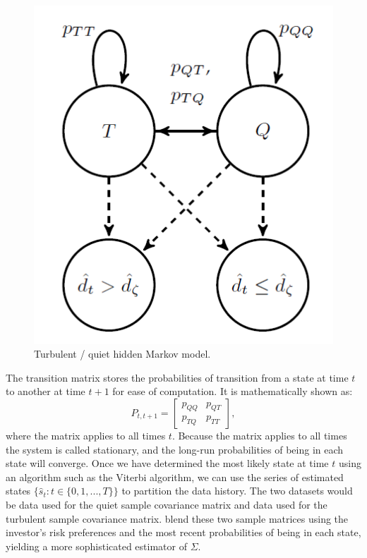 \documentclass[
]{article}
\begin{document}
\begin{figure}

{\centering \includegraphics{quiet_turb_hmm} 

}

\caption{Turbulent / quiet hidden Markov model.}\label{fig:hmm}
\end{figure}

The transition matrix stores the probabilities of transition from a state at time \(t\) to another at
time \(t + 1\) for ease of computation. It is mathematically shown as:
\[P_{t, t + 1} = \begin{bmatrix} 
p_{QQ} & p_{QT} \\
p_{TQ} & p_{TT}  
\end{bmatrix},\]
where the matrix applies to all times \(t\). Because the matrix applies to all times the system is called
stationary, and the long-run probabilities of being in each state will converge. Once we have
determined the most likely state at time \(t\) using an algorithm such as the Viterbi algorithm, we can
use the series of estimated states \(\{\hat{s}_t: t \in \{0, 1, ..., T\}\}\) to partition the
data history. The two datasets would be data used for the quiet sample covariance matrix and data used
for the turbulent sample covariance matrix. \citet{FD18} blend these two sample matrices using the investor's
risk preferences and the most recent probabilities of being in each state, yielding a more
sophisticated estimator of \(\Sigma\).
\end{document}
